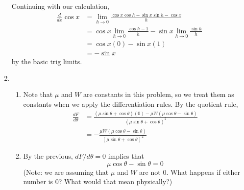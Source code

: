 \documentclass{article}
\begin{document}
\begin{enumerate}
  Continuing with our calculation,
  \begin{align*}
    \frac{d}{dx} \cos x &= \lim_{h\to 0}
                          \frac{\cos x \cos h -\sin x \sin h -\cos x}{
                          h}
    \\
                        &= \cos x \lim_{h\to 0} \frac{\cos h-1}{h}
                          - \sin x\lim_{h\to 0} \frac {\sin h}{h}
    \\
                        &= \cos x (0) - \sin x (1)
    \\
                        &= -\sin x
  \end{align*}
  by the basic trig limits.
\item %
  \begin{enumerate}
  \item %
    Note that $\mu$ and $W$ are constants in this problem, so we treat
    them as constants when we apply the differentiation rules.  By the
    quotient rule,
    \begin{align*}
      \frac{dF}{d\theta} &= \frac{(\mu\sin\theta+\cos\theta)(0) - \mu
                           W(\mu\cos\theta - \sin\theta)}{
                           (\mu\sin\theta+\cos\theta)^2}
      \\
                         &= -\frac{\mu W(\mu\cos\theta-\sin\theta)}{
                           (\mu\sin\theta+\cos\theta)^2}
    \end{align*}
  \item %
    By the previous, $dF/d\theta=0$ implies that
    \begin{equation*}
      \mu\cos\theta-\sin\theta = 0
    \end{equation*}
    (Note: we are assuming that $\mu$ and $W$ are not $0$.  What
    happens if either number is $0$?  What would that mean
    physically?)


\end{enumerate}
\end{enumerate}
\end{document}

